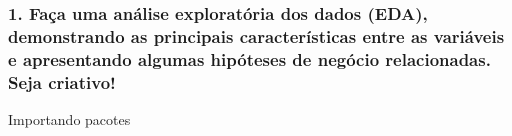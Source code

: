 \documentclass[11pt]{article}
\begin{document}
    \hypertarget{fauxe7a-uma-anuxe1lise-exploratuxf3ria-dos-dados-eda-demonstrando-as-principais-caracteruxedsticas-entre-as-variuxe1veis-e-apresentando-algumas-hipuxf3teses-de-neguxf3cio-relacionadas.-seja-criativo}{%
\subsubsection{1. Faça uma análise exploratória dos dados (EDA),
demonstrando as principais características entre as variáveis e
apresentando algumas hipóteses de negócio relacionadas. Seja
criativo!}\label{fauxe7a-uma-anuxe1lise-exploratuxf3ria-dos-dados-eda-demonstrando-as-principais-caracteruxedsticas-entre-as-variuxe1veis-e-apresentando-algumas-hipuxf3teses-de-neguxf3cio-relacionadas.-seja-criativo}}

Importando pacotes
\end{document}
